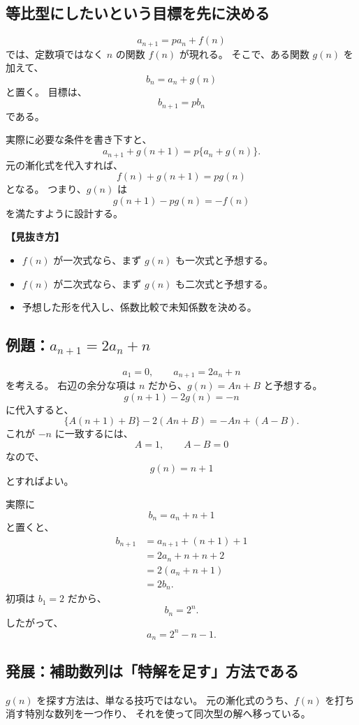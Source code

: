 \subsection{等比型にしたいという目標を先に決める}

\[
  a_{n+1}=pa_n+f(n)
\]
では、定数項ではなく $n$ の関数 $f(n)$ が現れる。
そこで、ある関数 $g(n)$ を加えて、
\[
  b_n=a_n+g(n)
\]
と置く。
目標は、
\[
  b_{n+1}=pb_n
\]
である。

実際に必要な条件を書き下すと、
\[
  a_{n+1}+g(n+1)=p\{a_n+g(n)\}.
\]
元の漸化式を代入すれば、
\[
  f(n)+g(n+1)=pg(n)
\]
となる。
つまり、$g(n)$ は
\[
  g(n+1)-pg(n)=-f(n)
\]
を満たすように設計する。

\noindent\textbf{【見抜き方】}

\begin{itemize}
  \item $f(n)$ が一次式なら、まず $g(n)$ も一次式と予想する。
  \item $f(n)$ が二次式なら、まず $g(n)$ も二次式と予想する。
  \item 予想した形を代入し、係数比較で未知係数を決める。
\end{itemize}

\subsection{例題：$a_{n+1}=2a_n+n$}

\[
  a_1=0,\qquad a_{n+1}=2a_n+n
\]
を考える。
右辺の余分な項は $n$ だから、$g(n)=An+B$ と予想する。
\[
  g(n+1)-2g(n)=-n
\]
に代入すると、
\[
  \{A(n+1)+B\}-2(An+B)
  =-An+(A-B).
\]
これが $-n$ に一致するには、
\[
  A=1,\qquad A-B=0
\]
なので、
\[
  g(n)=n+1
\]
とすればよい。

実際に
\[
  b_n=a_n+n+1
\]
と置くと、
\[
  \begin{aligned}
    b_{n+1}
     & =a_{n+1}+(n+1)+1 \\
     & =2a_n+n+n+2      \\
     & =2(a_n+n+1)      \\
     & =2b_n.
  \end{aligned}
\]
初項は $b_1=2$ だから、
\[
  b_n=2^n.
\]
したがって、
\[
  \boxed{a_n=2^n-n-1}.
\]

\subsection{発展：補助数列は「特解を足す」方法である}

$g(n)$ を探す方法は、単なる技巧ではない。
元の漸化式のうち、$f(n)$ を打ち消す特別な数列を一つ作り、
それを使って同次型の解へ移っている。

